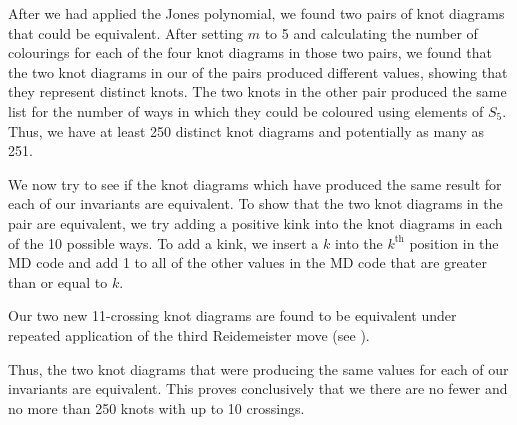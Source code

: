 \begin{paper}
After we had applied the Jones polynomial, we found two pairs of knot diagrams
that could be equivalent.
After setting $m$ to 5 and calculating the number of colourings for each of the
four knot diagrams in those two pairs, we found that the two knot diagrams in
our of the pairs produced different values, showing that they represent distinct
knots.
The two knots in the other pair produced the same list for the number of ways in
which they could be coloured using elements of $S_5$.
Thus, we have at least 250 distinct knot diagrams and potentially as many as
251.

\noindent{}


\noindent{}

We now try to see if the knot diagrams which have produced the same result for
each of our invariants are equivalent.
To show that the two knot diagrams in the pair are equivalent, we try adding a
positive kink into the knot diagrams in each of the 10 possible ways.
To add a kink, we insert a $k$ into the $k^\text{th}$ position in the MD code
and add 1 to all of the other values in the MD code that are greater than or
equal to $k$.

\noindent{}


Our two new 11-crossing knot diagrams are found to be equivalent under repeated
application of the third Reidemeister move (see \figMoves).


Thus, the two knot diagrams that were producing the same values for each of our
invariants are equivalent.
This proves conclusively that we there are no fewer and no more than 250 knots
with up to 10 crossings.


\end{paper}
